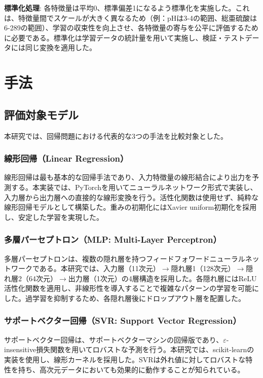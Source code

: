 \documentclass[12pt,a4paper,dvipdfmx]{jsarticle}
\begin{document}
\textbf{標準化処理}: 各特徴量は平均0、標準偏差1になるよう標準化を実施した。これは、特徴量間でスケールが大きく異なるため（例：pHは3-4の範囲、総亜硫酸は6-289の範囲）、学習の収束性を向上させ、各特徴量の寄与を公平に評価するために必要である。標準化は学習データの統計量を用いて実施し、検証・テストデータには同じ変換を適用した。

\section{手法}

\subsection{評価対象モデル}

本研究では、回帰問題における代表的な3つの手法を比較対象とした。

\subsubsection{線形回帰（Linear Regression）}

線形回帰は最も基本的な回帰手法であり、入力特徴量の線形結合により出力を予測する。本実装では、PyTorchを用いてニューラルネットワーク形式で実装し、入力層から出力層への直接的な線形変換を行う。活性化関数は使用せず、純粋な線形回帰モデルとして構築した。重みの初期化にはXavier uniform初期化を採用し、安定した学習を実現した。

\subsubsection{多層パーセプトロン（MLP: Multi-Layer Perceptron）}

多層パーセプトロンは、複数の隠れ層を持つフィードフォワードニューラルネットワークである。本研究では、入力層（11次元）$\rightarrow$隠れ層1（128次元）$\rightarrow$隠れ層2（64次元）$\rightarrow$出力層（1次元）の4層構造を採用した。各隠れ層にはReLU活性化関数を適用し、非線形性を導入することで複雑なパターンの学習を可能にした。過学習を抑制するため、各隠れ層後にドロップアウト層を配置した。

\subsubsection{サポートベクター回帰（SVR: Support Vector Regression）}

サポートベクター回帰は、サポートベクターマシンの回帰版であり、$\varepsilon$-insensitive損失関数を用いてロバストな予測を行う。本研究では、scikit-learnの実装を使用し、線形カーネルを採用した。SVRは外れ値に対してロバストな特性を持ち、高次元データにおいても効果的に動作することが知られている。
\end{document}
